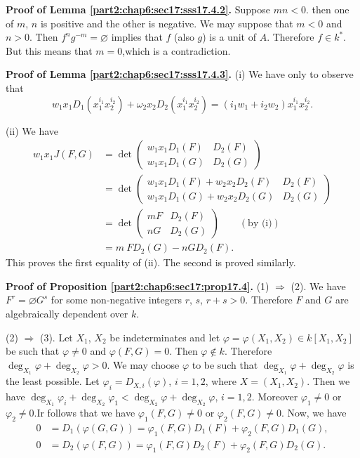 \medskip
\noindent \textbf{Proof of Lemma \ref{part2:chap6:sec17:sss17.4.2}.}
Suppose $mn< 0$. then one of $m$, $n$ is positive and the other is
negative. We may suppose that $m < 0$ and $n> 0$. Then $f^n g^{-m}=
\diameter$ implies that $f$ (also $g$) is a unit of $A$. Therefore $f
\in k^*$. But this means that $m =0$,\pageoriginale which is a
contradiction.

\medskip
\noindent \textbf{Proof of Lemma \ref{part2:chap6:sec17:sss17.4.3}.} 
(i) We have only to observe that
$$
w_1 x_1 D_1 \left( x_1^{i_1} x_2^{i_2}\right)+ \omega_2 x_2 D_2
\left(x_1^{i_1} x_2^{i_2} \right) = \left(i_1 w_1 + i_2 w_2 \right)
x_1^{i_1}  x_2^{i_2}.
$$

(ii) We have
\begin{align*}
  w_1 x_1 J(F, G) & = \det 
  \begin{pmatrix}
    w_1 x_1 D_1 (F) & D_2 (F)\\
    w_1 x_1 D_1 (G) & D_2 (G)
  \end{pmatrix}\\
  & = \det 
  \begin{pmatrix}
    w_1 x_1 D_1 (F)+ w_2 x_2 D_2 (F) & D_2 (F)\\
    w_1 x_1 D_1 (G) + w_2 x_2 D_2 (G) & D_2 (G)
  \end{pmatrix}\\
  & = \det 
  \begin{pmatrix}
    mF & D_2 (F)\\
    nG & D_2 (G)
  \end{pmatrix} \qquad (\text{by (i)})\\
  & = m ~ F D_2 (G) - n G D_2 (F).
\end{align*}
This proves the first equality of (ii). The second is proved
similarly.

\medskip
\noindent \textbf{Proof of Proposition \ref{part2:chap6:sec17:prop17.4}.} 
(1) $\Rightarrow$ (2). We have
$F^r = \diameter G^s$ for some non-negative  integers $r$, $s$, $r+s>
0$. Therefore $F$ and $G$ are algebraically dependent over $k$.

(2) $\Rightarrow$ (3). Let $X_1$, $X_2$ be indeterminates and let
$\varphi= \varphi (X_1, X_2)\in k[X_1, X_2]$ be such that $\varphi
\neq 0$ and $\varphi (F, G)=0$. Then $\varphi \notin k$. Therefore
$\deg_{X_1} \varphi+ \deg_{X_2}\varphi > 0$. We may choose $\varphi$
to be such that $\deg_{X_1} \varphi+ \deg_{X_2}\varphi$ is the least
possible. Let $\varphi_i = D_{X, i}(\varphi)$, $i=1, 2$, where $X=
(X_1, X_2)$. Then we have $\deg_{X_1} \varphi_i + \deg_{X_2}
\varphi_1< \deg_{X_2}\varphi+ \deg_{X_2}\varphi$, $i= 1, 2$. Moreover
$\varphi_1 \neq 0$ or $\varphi_2\neq 0$.\pageoriginale Ir follows that
we have $\varphi_1 (F, G)\neq 0$ or $\varphi_2 (F, G) \neq 0$. Now, we
have
\begin{align*}
  0 & = D_1 (\varphi (G, G)) = \varphi_1 (F, G) D_1 (F)+ \varphi_2 (F,
  G)D_1 (G),\\
  0 & = D_2 (\varphi (F, G)) = \varphi_1 (F, G)D_2 (F) + \varphi_2 (F,
  G) D_2 (G).
\end{align*}

